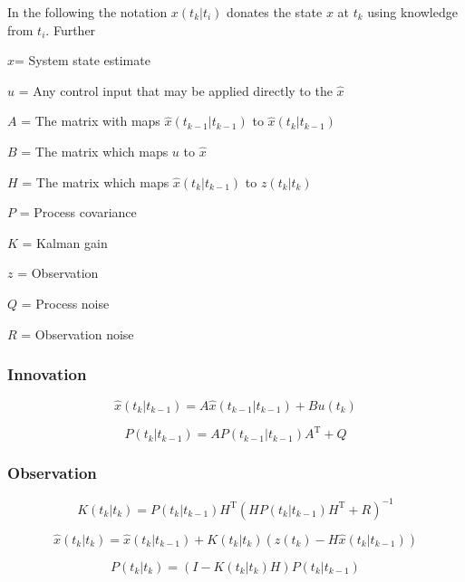 \documentclass[a4paper]{report}
\numberwithin{equation}{chapter}
\begin{document}
\bigskip

In the following the notation $x \left( t_k|t_i \right)$ donates the state $x$ at $t_k$ using knowledge from $t_i$. Further

$\hat{x}$= System state estimate

$u$ = Any control input that may be applied directly to the $\hat{x}$

$A$ = The matrix with maps $\hat{x} \left( t_{k - 1}|t_{k - 1} \right)$ to $\hat{x} \left( t_k|t_{k - 1} \right)$

$B$ = The matrix which maps $u$ to $\hat{x}$

$H$ = The matrix which maps $\hat{x} \left( t_k|t_{k - 1} \right)$ to $z \left( t_k|t_k \right)$

$P$ = Process covariance

$K$ = Kalman gain

$z$ = Observation

$Q$ = Process noise

$R$ = Observation noise

\subsubsection[Innovation]{Innovation}

\begin{equation}
\hat{x} \left( t_k|t_{k-1} \right) = A\hat{x} \left( t_{k-1}|t_{k-1} \right) + Bu \left( t_k \right)
\end{equation}

\begin{equation}
P \left( t_k|t_{k-1} \right) = A P \left( t_{k-1}|t_{k-1} \right) A^{\mathrm{T}} + Q
\end{equation}

\subsubsection[Observation]{Observation}

\begin{equation}
K \left( t_k|t_k \right) = P \left( t_k|t_{k-1} \right) H^{\mathrm{T}} \left( HP \left( t_k|t_{k-1} \right) H^{\mathrm{T}} + R \right) ^{-1}
\end{equation}

\begin{equation}
\hat{x} \left( t_k|t_k \right) = \hat{x} \left( t_k|t_{k-1} \right) + K \left( t_k|t_k \right) \left( z \left(t_k \right) - H\hat{x} \left( t_k|t_{k-1} \right) \right)
\end{equation}

\begin{equation}
P \left( t_k|t_k \right) = \left( I - K \left( t_k|t_k \right)H \right) P \left( t_k|t_{k-1} \right)
\end{equation}
\end{document}
